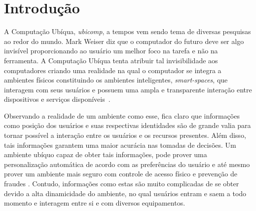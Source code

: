 
\chapter{Introdução}
	
A Computação Ubíqua, \textit{ubicomp}, a tempos vem sendo tema de diversas pesquisas ao redor do mundo. Mark Weiser diz que o computador do futuro deve ser algo invisível proporcionando ao usuário um melhor foco na tarefa e não na ferramenta. A Computação Ubíqua tenta atribuir tal invisibilidade aos computadores criando uma realidade na qual o computador se integra a ambientes físicos constituindo os ambientes inteligentes, \textit{smart-spaces}, que interagem com seus usuários e possuem uma ampla e transparente interação entre dispositivos e serviços disponíveis~\cite{fabriciobuzzeto,alegomes,weiser1, weiser2}.

Observando a realidade de um ambiente como esse, fica claro que informações como posição dos usuários e suas respectivas identidades são de grande valia para tornar possível a interação entre os usuários e os recursos presentes. Além disso, tais informações garantem uma maior acurácia nas tomadas de decisões. Um ambiente ubíquo capaz de obter tais informações, pode prover uma personalização automática de acordo com as preferências do usuário e até mesmo prover um ambiente mais seguro com controle de acesso físico e prevenção de fraudes \cite{saocarlos}. Contudo, informações como estas são muito complicadas de se obter devido a alta dinamicidade do ambiente, no qual usuários entram e saem a todo momento e interagem entre si e com diversos equipamentos.





